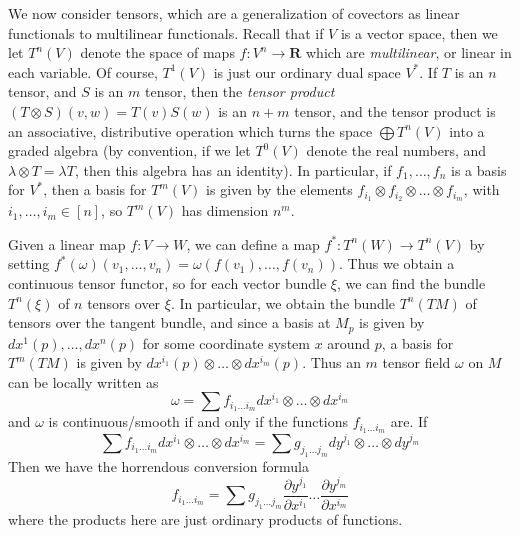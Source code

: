 We now consider tensors, which are a generalization of covectors as linear functionals to multilinear functionals. Recall that if $V$ is a vector space, then we let $T^n(V)$ denote the space of maps $f: V^n \to \mathbf{R}$ which are {\it multilinear}, or linear in each variable. Of course, $T^1(V)$ is just our ordinary dual space $V^*$. If $T$ is an $n$ tensor, and $S$ is an $m$ tensor, then the {\it tensor product} $(T \otimes S)(v,w) = T(v)S(w)$ is an $n + m$ tensor, and the tensor product is an associative, distributive operation which turns the space $\bigoplus T^n(V)$ into a graded algebra (by convention, if we let $T^0(V)$ denote the real numbers, and $\lambda \otimes T = \lambda T$, then this algebra has an identity). In particular, if $f_1, \dots, f_n$ is a basis for $V^*$, then a basis for $T^m(V)$ is given by the elements $f_{i_1} \otimes f_{i_2} \otimes \dots \otimes f_{i_m}$, with $i_1, \dots, i_m \in [n]$, so $T^m(V)$ has dimension $n^m$.

Given a linear map $f: V \to W$, we can define a map $f^*: T^n(W) \to T^n(V)$ by setting $f^*(\omega)(v_1, \dots, v_n) = \omega(f(v_1), \dots, f(v_n))$. Thus we obtain a continuous tensor functor, so for each vector bundle $\xi$, we can find the bundle $T^n(\xi)$ of $n$ tensors over $\xi$. In particular, we obtain the bundle $T^n(TM)$ of tensors over the tangent bundle, and since a basis at $M_p$ is given by $dx^1(p), \dots, dx^n(p)$ for some coordinate system $x$ around $p$, a basis for $T^m(TM)$ is given by $dx^{i_1}(p) \otimes \dots \otimes dx^{i_m}(p)$. Thus an $m$ tensor field $\omega$ on $M$ can be locally written as
%
\[ \omega = \sum f_{i_1 \dots i_m} dx^{i_1} \otimes \dots \otimes dx^{i_m} \]
%
and $\omega$ is continuous/smooth if and only if the functions $f_{i_1 \dots i_m}$ are. If
%
\[ \sum f_{i_1 \dots i_m} dx^{i_1} \otimes \dots \otimes dx^{i_m} = \sum g_{j_1 \dots j_m} dy^{j_1} \otimes \dots \otimes dy^{j_m} \]
%
Then we have the horrendous conversion formula
%
\[ f_{i_1 \dots i_m} = \sum g_{j_1 \dots j_m} \frac{\partial y^{j_1}}{\partial x^{i_1}} \dots \frac{\partial y^{j_m}}{\partial x^{i_m}} \]
%
where the products here are just ordinary products of functions.

